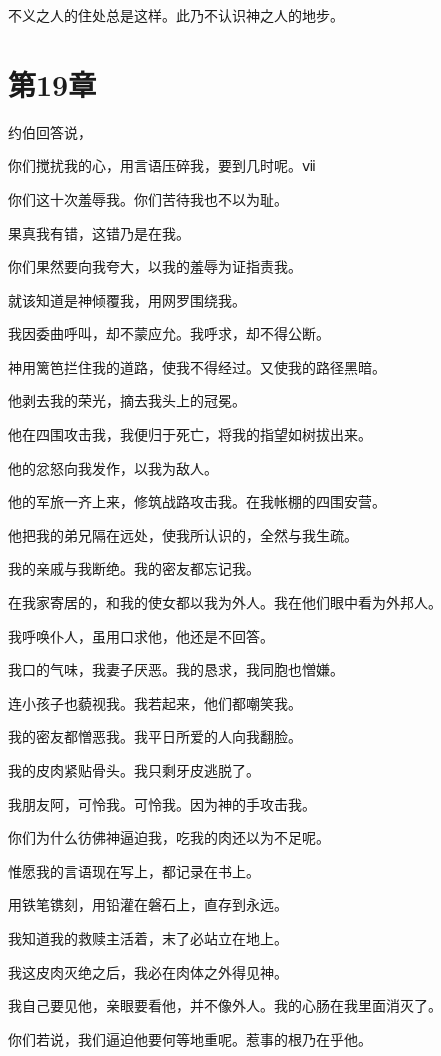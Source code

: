 \documentclass[12pt,oneside]{book}
\begin{document}
不义之人的住处总是这样。此乃不认识神之人的地步。


\chapter{第19章}
约伯回答说，

你们搅扰我的心，用言语压碎我，要到几时呢。ⅶ

你们这十次羞辱我。你们苦待我也不以为耻。

果真我有错，这错乃是在我。

你们果然要向我夸大，以我的羞辱为证指责我。

就该知道是神倾覆我，用网罗围绕我。

我因委曲呼叫，却不蒙应允。我呼求，却不得公断。

神用篱笆拦住我的道路，使我不得经过。又使我的路径黑暗。

他剥去我的荣光，摘去我头上的冠冕。

他在四围攻击我，我便归于死亡，将我的指望如树拔出来。

他的忿怒向我发作，以我为敌人。

他的军旅一齐上来，修筑战路攻击我。在我帐棚的四围安营。

他把我的弟兄隔在远处，使我所认识的，全然与我生疏。

我的亲戚与我断绝。我的密友都忘记我。

在我家寄居的，和我的使女都以我为外人。我在他们眼中看为外邦人。

我呼唤仆人，虽用口求他，他还是不回答。

我口的气味，我妻子厌恶。我的恳求，我同胞也憎嫌。

连小孩子也藐视我。我若起来，他们都嘲笑我。

我的密友都憎恶我。我平日所爱的人向我翻脸。

我的皮肉紧贴骨头。我只剩牙皮逃脱了。

我朋友阿，可怜我。可怜我。因为神的手攻击我。

你们为什么彷佛神逼迫我，吃我的肉还以为不足呢。

惟愿我的言语现在写上，都记录在书上。

用铁笔镌刻，用铅灌在磐石上，直存到永远。

我知道我的救赎主活着，末了必站立在地上。

我这皮肉灭绝之后，我必在肉体之外得见神。

我自己要见他，亲眼要看他，并不像外人。我的心肠在我里面消灭了。

你们若说，我们逼迫他要何等地重呢。惹事的根乃在乎他。
\end{document}

